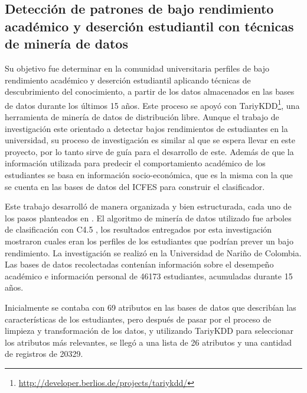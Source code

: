 \subsection{Detección de patrones de bajo rendimiento académico y deserción estudiantil con técnicas de minería de datos \cite{key-100}}
Su objetivo fue determinar en la comunidad universitaria perfiles de bajo rendimiento académico y deserción estudiantil aplicando técnicas de descubrimiento del conocimiento, a partir de los datos almacenados en las bases de datos durante los últimos 15 años. Este proceso se apoyó con TariyKDD\footnote{\url{http://developer.berlios.de/projects/tariykdd/}}, una herramienta de minería de datos de distribución libre. Aunque el trabajo de investigación este orientado a detectar bajos rendimientos de estudiantes en la universidad, su proceso de investigación es similar al que se espera llevar en este proyecto, por lo tanto sirve de guía para el desarrollo de este. Además de que la información utilizada para predecir el comportamiento académico de los estudiantes se basa en información socio-económica, que es la misma con la que se cuenta en las bases de datos del ICFES para construir el clasificador.

Este trabajo desarrolló de manera organizada y bien estructurada, cada uno de los pasos planteados en \cite{key-50}. El algoritmo de minería de datos utilizado fue arboles de clasificación con C4.5 \cite{key-50, key-70}, los resultados entregados por esta investigación mostraron cuales eran los perfiles de los estudiantes que podrían prever un bajo rendimiento.
La investigación se realizó en la Universidad de Nariño de Colombia. Las bases de datos recolectadas contenían información sobre el desempeño académico e información personal de 46173 estudiantes, acumuladas durante 15 años.

Inicialmente se contaba con 69 atributos en las bases de datos que describían las características de los estudiantes, pero después de pasar por el proceso de limpieza y transformación de los datos, y utilizando TariyKDD para seleccionar los atributos más relevantes, se llegó a una lista de 26 atributos y una cantidad de registros de 20329.

